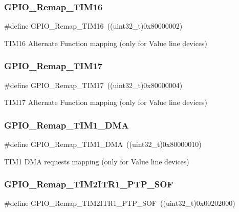 \subsubsection{\texorpdfstring{GPIO\_Remap\_TIM16}{GPIO\_Remap\_TIM16}}
{\footnotesize\ttfamily \#define G\+P\+I\+O\+\_\+\+Remap\+\_\+\+T\+I\+M16~((uint32\+\_\+t)0x80000002)}

T\+I\+M16 Alternate Function mapping (only for Value line devices) \mbox{\label{group___g_p_i_o___remap__define_ga9fe98e01f8837d6a1ac4b4833f0fc45e}} 
\subsubsection{\texorpdfstring{GPIO\_Remap\_TIM17}{GPIO\_Remap\_TIM17}}
{\footnotesize\ttfamily \#define G\+P\+I\+O\+\_\+\+Remap\+\_\+\+T\+I\+M17~((uint32\+\_\+t)0x80000004)}

T\+I\+M17 Alternate Function mapping (only for Value line devices) \mbox{\label{group___g_p_i_o___remap__define_ga255adf908d7d530267707fee39ba2026}} 
\subsubsection{\texorpdfstring{GPIO\_Remap\_TIM1\_DMA}{GPIO\_Remap\_TIM1\_DMA}}
{\footnotesize\ttfamily \#define G\+P\+I\+O\+\_\+\+Remap\+\_\+\+T\+I\+M1\+\_\+\+D\+MA~((uint32\+\_\+t)0x80000010)}

T\+I\+M1 D\+MA requests mapping (only for Value line devices) \mbox{\label{group___g_p_i_o___remap__define_ga0dc4bec540b9372479e63295fe68ac17}} 
\subsubsection{\texorpdfstring{GPIO\_Remap\_TIM2ITR1\_PTP\_SOF}{GPIO\_Remap\_TIM2ITR1\_PTP\_SOF}}
{\footnotesize\ttfamily \#define G\+P\+I\+O\+\_\+\+Remap\+\_\+\+T\+I\+M2\+I\+T\+R1\+\_\+\+P\+T\+P\+\_\+\+S\+OF~((uint32\+\_\+t)0x00202000)}

